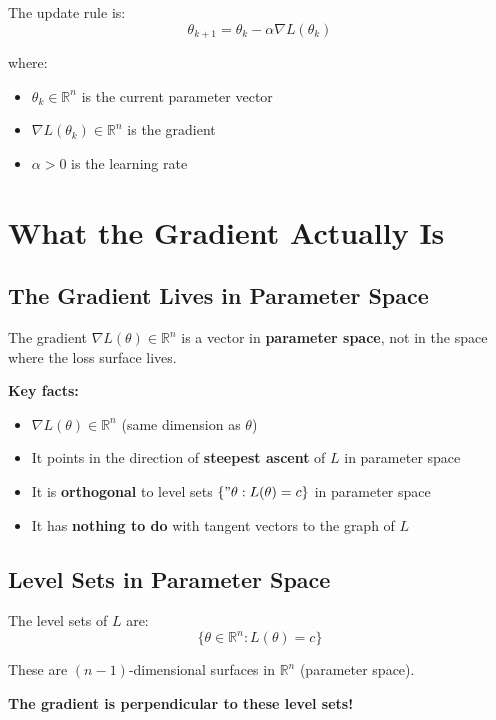 \begin{notechapter}
The update rule is:
\[
\theta_{k+1} = \theta_k - \alpha \nabla L(\theta_k)
\]

where:
\begin{itemize}
    \item $\theta_k \in \mathbb{R}^n$ is the current parameter vector
    \item $\nabla L(\theta_k) \in \mathbb{R}^n$ is the gradient
    \item $\alpha > 0$ is the learning rate
\end{itemize}

\section{What the Gradient Actually Is}

\subsection{The Gradient Lives in Parameter Space}

\begin{definition}
The gradient $\nabla L(\theta) \in \mathbb{R}^n$ is a vector in \textbf{parameter space}, not in the space where the loss surface lives.
\end{definition}

\textbf{Key facts:}
\begin{itemize}
    \item $\nabla L(\theta) \in \mathbb{R}^n$ (same dimension as $\theta$)
    \item It points in the direction of \textbf{steepest ascent} of $L$ in parameter space
    \item It is \textbf{orthogonal} to level sets $\{"\theta : L(\theta) = c\}$ in parameter space
    \item It has \textbf{nothing to do} with tangent vectors to the graph of $L$
\end{itemize}

\subsection{Level Sets in Parameter Space}

The level sets of $L$ are:
\[
\{\theta \in \mathbb{R}^n : L(\theta) = c\}
\]

These are $(n-1)$-dimensional surfaces in $\mathbb{R}^n$ (parameter space).

\textbf{The gradient is perpendicular to these level sets!}


\end{notechapter}
